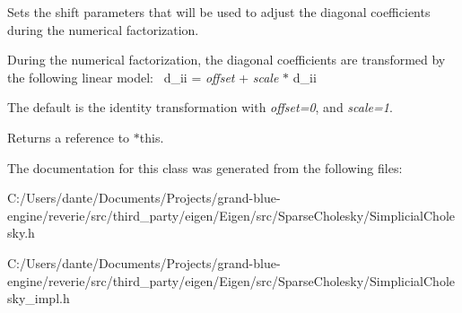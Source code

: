 Sets the shift parameters that will be used to adjust the diagonal coefficients during the numerical factorization.

During the numerical factorization, the diagonal coefficients are transformed by the following linear model\+:~\newline
{\ttfamily d\+\_\+ii} = {\itshape offset} + {\itshape scale} $\ast$ {\ttfamily d\+\_\+ii} 

The default is the identity transformation with {\itshape offset=0}, and {\itshape scale=1}.

\begin{DoxyReturn}{Returns}
a reference to {\ttfamily $\ast$this}. 
\end{DoxyReturn}


The documentation for this class was generated from the following files\+:\begin{DoxyCompactItemize}
\item 
C\+:/\+Users/dante/\+Documents/\+Projects/grand-\/blue-\/engine/reverie/src/third\+\_\+party/eigen/\+Eigen/src/\+Sparse\+Cholesky/Simplicial\+Cholesky.\+h\item 
C\+:/\+Users/dante/\+Documents/\+Projects/grand-\/blue-\/engine/reverie/src/third\+\_\+party/eigen/\+Eigen/src/\+Sparse\+Cholesky/Simplicial\+Cholesky\+\_\+impl.\+h\end{DoxyCompactItemize}

